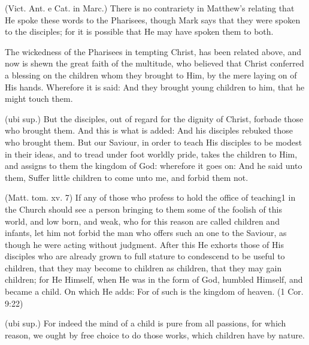  (Vict. Ant. e Cat. in Marc.) There is no contrariety in Matthew’s relating that He spoke these words to the Pharisees, though Mark says that they were spoken to the disciples; for it is possible that He may have spoken them to both.

 

 The wickedness of the Pharisees in tempting Christ, has been related above, and now is shewn the great faith of the multitude, who believed that Christ conferred a blessing on the children whom they brought to Him, by the mere laying on of His hands. Wherefore it is said: And they brought young children to him, that he might touch them.

 (ubi sup.) But the disciples, out of regard for the dignity of Christ, forbade those who brought them. And this is what is added: And his disciples rebuked those who brought them. But our Saviour, in order to teach His disciples to be modest in their ideas, and to tread under foot worldly pride, takes the children to Him, and assigns to them the kingdom of God: wherefore it goes on: And he said unto them, Suffer little children to come unto me, and forbid them not.

 (Matt. tom. xv. 7) If any of those who profess to hold the office of teaching1 in the Church should see a person bringing to them some of the foolish of this world, and low born, and weak, who for this reason are called children and infants, let him not forbid the man who offers such an one to the Saviour, as though he were acting without judgment. After this He exhorts those of His disciples who are already grown to full stature to condescend to be useful to children, that they may become to children as children, that they may gain children; for He Himself, when He was in the form of God, humbled Himself, and became a child. On which He adds: For of such is the kingdom of heaven. (1 Cor. 9:22)

 (ubi sup.) For indeed the mind of a child is pure from all passions, for which reason, we ought by free choice to do those works, which children have by nature.

